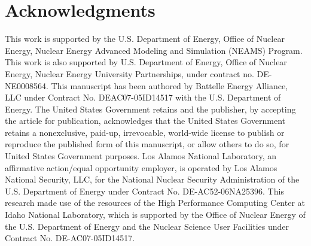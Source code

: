 \documentclass[review]{elsarticle}
\begin{document}
\section{Acknowledgments}
This work is supported by the U.S. Department of Energy, Office of Nuclear Energy, Nuclear Energy Advanced Modeling and Simulation (NEAMS) Program. This work is also supported by U.S. Department of Energy, Office of Nuclear Energy, Nuclear Energy University Partnerships, under contract no. DE-NE0008564. This manuscript has been authored by Battelle Energy Alliance, LLC under Contract No. DEAC07-05ID14517 with the U.S. Department of Energy. The United States Government retains and the publisher, by accepting the article for publication, acknowledges that the United States Government retains a nonexclusive, paid-up, irrevocable, world-wide license to publish or reproduce the published form of this manuscript, or allow others to do so, for United States Government purposes. Los Alamos National Laboratory, an affirmative action/equal opportunity employer, is operated by Los Alamos National Security, LLC, for the National Nuclear Security Administration of the U.S. Department of Energy under Contract No. DE-AC52-06NA25396. This research made use of the resources of the High Performance Computing Center at Idaho National Laboratory, which is supported by the Office of Nuclear Energy of the U.S. Department of Energy and the Nuclear Science User Facilities under Contract No. DE-AC07-05ID14517.



\end{document}
